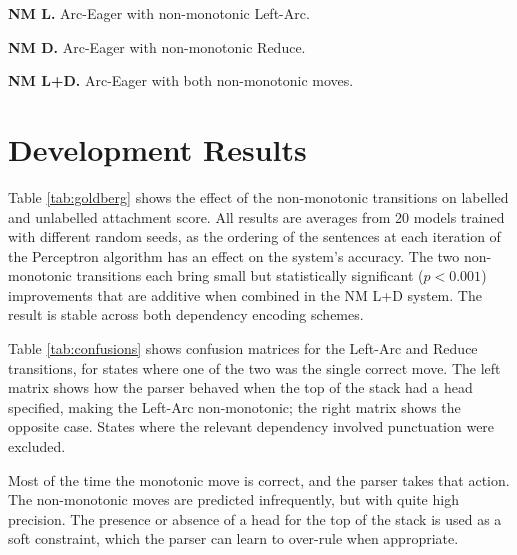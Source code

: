 \documentclass[11pt,letterpaper]{article}
\begin{document}
\noindent\textbf{NM L.} Arc-Eager with non-monotonic Left-Arc.

\noindent\textbf{NM D.} Arc-Eager with non-monotonic Reduce.

\noindent\textbf{NM L+D.} Arc-Eager with both non-monotonic moves.

\section{Development Results}
\label{sec:results}

Table \ref{tab:goldberg} shows the effect of the non-monotonic transitions on
labelled and unlabelled attachment score. All results are averages from 20 models
trained with different random seeds, as the ordering of the sentences at each iteration
of the Perceptron algorithm has an effect on the system's accuracy.
The two non-monotonic transitions each bring small but statistically significant
($p < 0.001$) improvements that are additive when combined in the NM L+D system.
The result is stable across both dependency encoding schemes.

Table \ref{tab:confusions} shows confusion matrices for the Left-Arc and Reduce
transitions, for states where one of the two was the single correct move.
The left matrix shows how the parser behaved when the top
of the stack had a head specified, making the Left-Arc non-monotonic; the right
matrix shows the opposite case.
States where the relevant dependency involved punctuation were excluded.

Most of the time the monotonic
move is correct, and the parser takes that action.
The non-monotonic moves are predicted infrequently, but with quite high precision.
The presence or absence of a head for the top of the stack is used as a soft
constraint, which the parser can learn to over-rule when appropriate.
\end{document}
